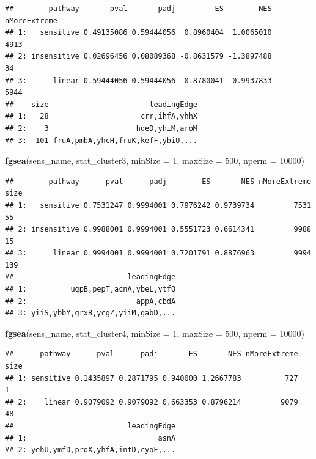 \documentclass[]{article}
\newenvironment{Shaded}{\begin{snugshade}}{\end{snugshade}}
\newcommand{\KeywordTok}[1]{\textcolor[rgb]{0.13,0.29,0.53}{\textbf{#1}}}
\newcommand{\DataTypeTok}[1]{\textcolor[rgb]{0.13,0.29,0.53}{#1}}
\newcommand{\DecValTok}[1]{\textcolor[rgb]{0.00,0.00,0.81}{#1}}
\newcommand{\NormalTok}[1]{#1}
\begin{document}
\begin{verbatim}
##        pathway       pval       padj         ES        NES nMoreExtreme
## 1:   sensitive 0.49135086 0.59444056  0.8960404  1.0065010         4913
## 2: insensitive 0.02696456 0.08089368 -0.8631579 -1.3897488           34
## 3:      linear 0.59444056 0.59444056  0.8780041  0.9937833         5944
##    size                       leadingEdge
## 1:   28                     crr,ihfA,yhhX
## 2:    3                    hdeD,yhiM,aroM
## 3:  101 fruA,pmbA,yhcH,fruK,kefF,ybiU,...
\end{verbatim}

\begin{Shaded}
\begin{Highlighting}[]
\KeywordTok{fgsea}\NormalTok{(sens_name, stat_cluster3, }\DataTypeTok{minSize =} \DecValTok{1}\NormalTok{, }\DataTypeTok{maxSize =} \DecValTok{500}\NormalTok{, }\DataTypeTok{nperm =} \DecValTok{10000}\NormalTok{)}
\end{Highlighting}
\end{Shaded}

\begin{verbatim}
##        pathway      pval      padj        ES       NES nMoreExtreme size
## 1:   sensitive 0.7531247 0.9994001 0.7976242 0.9739734         7531   55
## 2: insensitive 0.9988001 0.9994001 0.5551723 0.6614341         9988   15
## 3:      linear 0.9994001 0.9994001 0.7201791 0.8876963         9994  139
##                          leadingEdge
## 1:          ugpB,pepT,acnA,ybeL,ytfQ
## 2:                         appA,cbdA
## 3: yiiS,ybbY,grxB,ycgZ,yiiM,gabD,...
\end{verbatim}

\begin{Shaded}
\begin{Highlighting}[]
\KeywordTok{fgsea}\NormalTok{(sens_name, stat_cluster4, }\DataTypeTok{minSize =} \DecValTok{1}\NormalTok{, }\DataTypeTok{maxSize =} \DecValTok{500}\NormalTok{, }\DataTypeTok{nperm =} \DecValTok{10000}\NormalTok{)}
\end{Highlighting}
\end{Shaded}

\begin{verbatim}
##      pathway      pval      padj       ES       NES nMoreExtreme size
## 1: sensitive 0.1435897 0.2871795 0.940000 1.2667783          727    1
## 2:    linear 0.9079092 0.9079092 0.663353 0.8796214         9079   48
##                          leadingEdge
## 1:                              asnA
## 2: yehU,ymfD,proX,yhfA,intD,cyoE,...
\end{verbatim}
\end{document}
